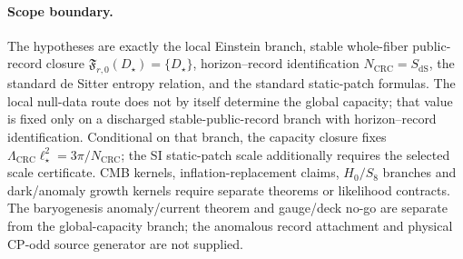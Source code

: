 \paragraph{Scope boundary.}
The hypotheses are exactly the local Einstein branch, stable whole-fiber public-record
closure \(\mathfrak F_{r,0}(D_\star)=\{D_\star\}\), horizon--record identification
\(N_{\mathrm{CRC}}=S_{\mathrm{dS}}\), the standard de Sitter entropy relation, and the standard
static-patch formulas. The local null-data route does not by itself determine the global capacity;
that value is fixed only on a discharged stable-public-record branch with
horizon--record identification. Conditional on that branch, the capacity closure fixes
\(\Lambda_{\mathrm{CRC}}\ell_\star^2=3\pi/N_{\mathrm{CRC}}\); the SI static-patch scale
additionally requires the selected scale certificate. CMB kernels, inflation-replacement claims,
\(H_0/S_8\) branches and dark/anomaly growth kernels require separate theorems or
likelihood contracts. The baryogenesis anomaly/current theorem and gauge/deck no-go are separate
from the global-capacity branch; the anomalous record attachment and physical CP-odd source generator are not supplied.

